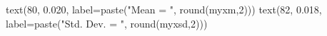 \begin{Schunk}
\begin{Sinput}
 text(80, 0.020, label=paste("Mean = ", round(myxm,2)))
 text(82, 0.018, label=paste("Std. Dev. = ", round(myxsd,2)))
\end{Sinput}
\end{Schunk}
